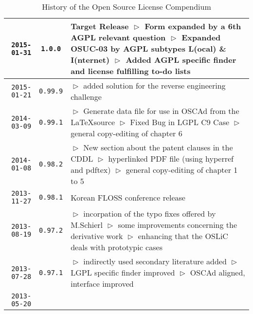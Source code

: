 \begin{table}
\footnotesize
\caption{History of the Open Source License Compendium}
\begin{center}
\begin{tabular}{|r|c|p{9.4cm}|}
\hline
    \texttt{2015-01-31}
  & \texttt{1.0.0}
  & Target Release\newline
  $\vartriangleright$ Form expanded by a 6th AGPL relevant question\newline
  $\vartriangleright$ Expanded OSUC-03 by AGPL subtypes L(ocal) \& I(nternet) \newline 
  $\vartriangleright$ Added AGPL specific finder and license fulfilling to-do lists\\
\hline
    \texttt{2015-01-21}
  & \texttt{0.99.9}
  & $\vartriangleright$ added solution for the reverse engineering challenge \\
\hline
    \texttt{2014-03-09}
  & \texttt{0.99.1}
  & $\vartriangleright$ Generate data file for use in OSCAd from the \LaTeX source\newline
  $\vartriangleright$ Fixed Bug in LGPL C9 Case \newline
  $\vartriangleright$ general copy-editing of chapter 6\\
\hline
    \texttt{2014-01-08}
  & \texttt{0.98.2}
  & $\vartriangleright$ New section about the patent clauses in the CDDL\newline
  $\vartriangleright$ hyperlinked PDF file (using hyperref and pdftex)\newline
  $\vartriangleright$ general copy-editing of chapter 1 to 5\\
\hline
    \texttt{2013-11-27}
  & \texttt{0.98.1}
  & Korean FLOSS conference release\\
\hline
    \texttt{2013-08-19}
  & \texttt{0.97.2}
  & $\vartriangleright$ incorpation of the typo fixes offered by M.Schierl\newline
  $\vartriangleright$ some improvements concerning the derivative work\newline
  $\vartriangleright$ enhancing that the OSLiC deals with prototypic cases\\
\hline
    \texttt{2013-07-28}
  & \texttt{0.97.1} 
  & $\vartriangleright$ indirectly used secondary literature added\newline
    $\vartriangleright$ LGPL specific finder improved\newline
    $\vartriangleright$ OSCAd aligned, interface improved\\
\hline
    \texttt{2013-05-20}

\end{tabular}
\end{center}
\end{table}
